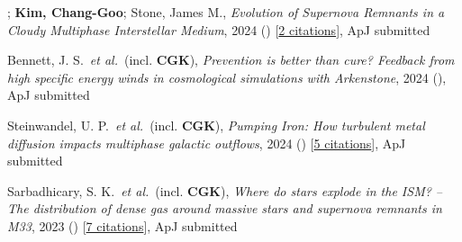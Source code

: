 \item {}; \textbf{Kim, Chang-Goo}; Stone, James M., \textit{Evolution of Supernova Remnants in a Cloudy Multiphase Interstellar Medium}, 2024 () [\href{http://adsabs.harvard.edu/abs/2024arXiv241112809G}{2 citations}], ApJ submitted

\item Bennett, J. S.~\textit{et al.}~(incl. \textbf{CGK}), \textit{Prevention is better than cure? Feedback from high specific energy winds in cosmological simulations with Arkenstone}, 2024 (), ApJ submitted

\item Steinwandel, U. P.~\textit{et al.}~(incl. \textbf{CGK}), \textit{Pumping Iron: How turbulent metal diffusion impacts multiphase galactic outflows}, 2024 () [\href{http://adsabs.harvard.edu/abs/2024arXiv240714599S}{5 citations}], ApJ submitted

\item Sarbadhicary, S. K.~\textit{et al.}~(incl. \textbf{CGK}), \textit{Where do stars explode in the ISM? -- The distribution of dense gas around massive stars and supernova remnants in M33}, 2023 () [\href{http://adsabs.harvard.edu/abs/2023arXiv231017694S}{7 citations}], ApJ submitted